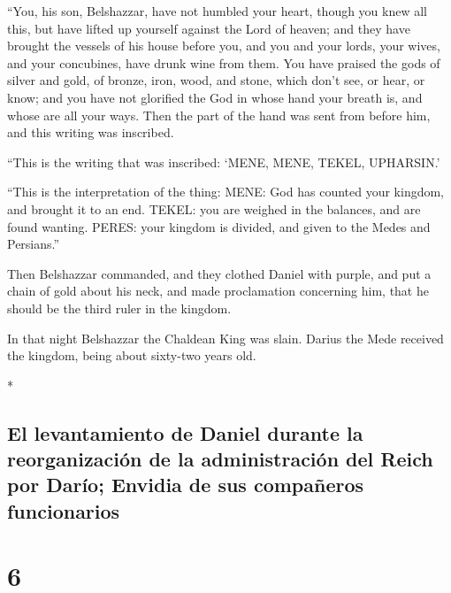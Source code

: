 \begin{paracol}{2}
\begin{otherlanguage}{english}
 ``You, his son, Belshazzar, have not humbled your heart,
though you knew all this,  but have lifted up yourself
against the Lord of heaven; and they have brought the vessels of his
house before you, and you and your lords, your wives, and your
concubines, have drunk wine from them. You have praised the gods of
silver and gold, of bronze, iron, wood, and stone, which don't see, or
hear, or know; and you have not glorified the God in whose hand your
breath is, and whose are all your ways.  Then the part of
the hand was sent from before him, and this writing was inscribed.

 ``This is the writing that was inscribed: `MENE, MENE,
TEKEL, UPHARSIN.'

 ``This is the interpretation of the thing: MENE: God has
counted your kingdom, and brought it to an end.  TEKEL:
you are weighed in the balances, and are found wanting. 
PERES: your kingdom is divided, and given to the Medes and Persians.''

 Then Belshazzar commanded, and they clothed Daniel with
purple, and put a chain of gold about his neck, and made proclamation
concerning him, that he should be the third ruler in the kingdom.

 In that night Belshazzar the Chaldean King was slain.
 Darius the Mede received the kingdom, being about
sixty-two years old.

\end{otherlanguage}

\switchcolumn[0]*

\hypertarget{el-levantamiento-de-daniel-durante-la-reorganizaciuxf3n-de-la-administraciuxf3n-del-reich-por-daruxedo-envidia-de-sus-compauxf1eros-funcionarios}{%
\subsection{El levantamiento de Daniel durante la reorganización de la
administración del Reich por Darío; Envidia de sus compañeros
funcionarios}\label{el-levantamiento-de-daniel-durante-la-reorganizaciuxf3n-de-la-administraciuxf3n-del-reich-por-daruxedo-envidia-de-sus-compauxf1eros-funcionarios}}

\hypertarget{section-10}{%
\section{6}\label{section-10}}


\end{paracol}
